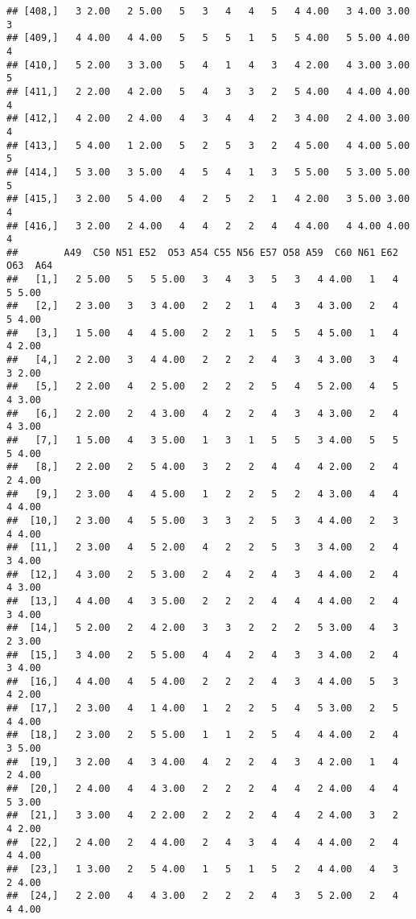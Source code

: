 \documentclass[]{article}
\begin{document}
\begin{verbatim}
## [408,]   3 2.00   2 5.00   5   3   4   4   5   4 4.00   3 4.00 3.00   3
## [409,]   4 4.00   4 4.00   5   5   5   1   5   5 4.00   5 5.00 4.00   4
## [410,]   5 2.00   3 3.00   5   4   1   4   3   4 2.00   4 3.00 3.00   5
## [411,]   2 2.00   4 2.00   5   4   3   3   2   5 4.00   4 4.00 4.00   4
## [412,]   4 2.00   2 4.00   4   3   4   4   2   3 4.00   2 4.00 3.00   4
## [413,]   5 4.00   1 2.00   5   2   5   3   2   4 5.00   4 4.00 5.00   5
## [414,]   5 3.00   3 5.00   4   5   4   1   3   5 5.00   5 3.00 5.00   5
## [415,]   3 2.00   5 4.00   4   2   5   2   1   4 2.00   3 5.00 3.00   4
## [416,]   3 2.00   2 4.00   4   4   2   2   4   4 4.00   4 4.00 4.00   4
##        A49  C50 N51 E52  O53 A54 C55 N56 E57 O58 A59  C60 N61 E62 O63  A64
##   [1,]   2 5.00   5   5 5.00   3   4   3   5   3   4 4.00   1   4   5 5.00
##   [2,]   2 3.00   3   3 4.00   2   2   1   4   3   4 3.00   2   4   5 4.00
##   [3,]   1 5.00   4   4 5.00   2   2   1   5   5   4 5.00   1   4   4 2.00
##   [4,]   2 2.00   3   4 4.00   2   2   2   4   3   4 3.00   3   4   3 2.00
##   [5,]   2 2.00   4   2 5.00   2   2   2   5   4   5 2.00   4   5   4 3.00
##   [6,]   2 2.00   2   4 3.00   4   2   2   4   3   4 3.00   2   4   4 3.00
##   [7,]   1 5.00   4   3 5.00   1   3   1   5   5   3 4.00   5   5   5 4.00
##   [8,]   2 2.00   2   5 4.00   3   2   2   4   4   4 2.00   2   4   2 4.00
##   [9,]   2 3.00   4   4 5.00   1   2   2   5   2   4 3.00   4   4   4 4.00
##  [10,]   2 3.00   4   5 5.00   3   3   2   5   3   4 4.00   2   3   4 4.00
##  [11,]   2 3.00   4   5 2.00   4   2   2   5   3   3 4.00   2   4   3 4.00
##  [12,]   4 3.00   2   5 3.00   2   4   2   4   3   4 4.00   2   4   4 3.00
##  [13,]   4 4.00   4   3 5.00   2   2   2   4   4   4 4.00   2   4   3 4.00
##  [14,]   5 2.00   2   4 2.00   3   3   2   2   2   5 3.00   4   3   2 3.00
##  [15,]   3 4.00   2   5 5.00   4   4   2   4   3   3 4.00   2   4   3 4.00
##  [16,]   4 4.00   4   5 4.00   2   2   2   4   3   4 4.00   5   3   4 2.00
##  [17,]   2 3.00   4   1 4.00   1   2   2   5   4   5 3.00   2   5   4 4.00
##  [18,]   2 3.00   2   5 5.00   1   1   2   5   4   4 4.00   2   4   3 5.00
##  [19,]   3 2.00   4   3 4.00   4   2   2   4   3   4 2.00   1   4   2 4.00
##  [20,]   2 4.00   4   4 3.00   2   2   2   4   4   2 4.00   4   4   5 3.00
##  [21,]   3 3.00   4   2 2.00   2   2   2   4   4   2 4.00   3   2   4 2.00
##  [22,]   2 4.00   2   4 4.00   2   4   3   4   4   4 4.00   2   4   4 4.00
##  [23,]   1 3.00   2   5 4.00   1   5   1   5   2   4 4.00   4   3   2 4.00
##  [24,]   2 2.00   4   4 3.00   2   2   2   4   3   5 2.00   2   4   4 4.00

\end{verbatim}
\end{document}
